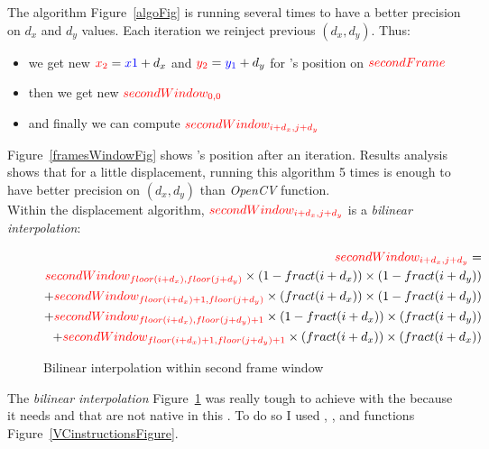 The algorithm Figure~\ref{algoFig} is running several times to have a better precision on $d_{x}$ and $d_{y}$ values. Each iteration we reinject previous $(d_{x},d_{y})$. Thus:
\begin{itemize}
	\item we get new $\textcolor{red}{x_{2}} = \textcolor{blue}{x{1}}+d_{x}$ and $\textcolor{red}{y_{2}} = \textcolor{blue}{y_{1}}+d_{y}$ for \feat{}'s position on $\textcolor{red}{secondFrame}$
	\item then we get new $\textcolor{red}{secondWindow_{0,0}}$
	\item and finally we can compute $\textcolor{red}{secondWindow_{i+d_{x},j+d_{y}}}$
\end{itemize}

Figure~\ref{framesWindowFig} shows \feat{}'s position after an iteration. Results analysis shows that for a little \feat{} displacement, running this algorithm 5 times is enough to have better precision on $(d_{x},d_{y})$ than \emph{OpenCV} function.\\


Within the displacement algorithm, $\textcolor{red}{secondWindow_{i+d_{x},j+d_{y}}}$ is a \emph{bilinear interpolation}:

\begin{figure}[!htbp]
\begin{mdframed}
\begin{equation*}
	\begin{split}
		\textcolor{red}{secondWindow_{i+d_{x},j+d_{y}}} =\\
		\textcolor{red}{secondWindow_{floor(i+d_{x}),floor(j+d_{y})}}\times (1-fract(i+d_{x}))\times (1-fract(i+d_{y}))\\
		+ \textcolor{red}{secondWindow_{floor(i+d_{x})+1,floor(j+d_{y})}}\times (fract(i+d_{x}))\times (1-fract(i+d_{y}))\\
		+ \textcolor{red}{secondWindow_{floor(i+d_{x}),floor(j+d_{y})+1}}\times (1-fract(i+d_{x}))\times (fract(i+d_{y}))\\
		+ \textcolor{red}{secondWindow_{floor(i+d_{x})+1,floor(j+d_{y})+1}}\times (fract(i+d_{x}))\times (fract(i+d_{x}))
	\end{split}
\end{equation*}
\end{mdframed}
\caption{Bilinear interpolation within second frame window}
\label{BIPFig}
\end{figure}
\FloatBarrier

The \emph{bilinear interpolation} Figure~\ref{BIPFig} was really tough to achieve with the \vc{} because it needs  and  that are not native in this . To do so I used , , and  functions Figure~\ref{VCinstructionsFigure}.


